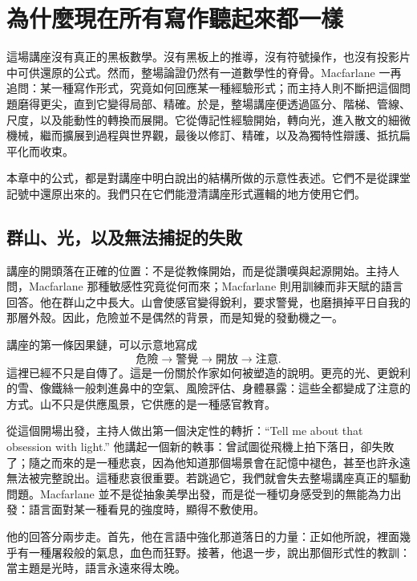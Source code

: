 \chapter{為什麼現在所有寫作聽起來都一樣}

這場講座沒有真正的黑板數學。沒有黑板上的推導，沒有符號操作，也沒有投影片中可供還原的公式。然而，整場論證仍然有一道數學性的脊骨。Macfarlane 一再追問：某一種寫作形式，究竟如何回應某一種經驗形式；而主持人則不斷把這個問題磨得更尖，直到它變得局部、精確。於是，整場講座便透過區分、階梯、管線、尺度，以及能動性的轉換而展開。它從傳記性經驗開始，轉向光，進入散文的細微機械，繼而擴展到過程與世界觀，最後以修訂、精確，以及為獨特性辯護、抵抗扁平化而收束。

\begin{remark}
本章中的公式，都是對講座中明白說出的結構所做的示意性表述。它們不是從課堂記號中還原出來的。我們只在它們能澄清講座形式邏輯的地方使用它們。
\end{remark}

\section{群山、光，以及無法捕捉的失敗}

講座的開頭落在正確的位置：不是從教條開始，而是從讚嘆與起源開始。主持人問，Macfarlane 那種敏感性究竟從何而來；Macfarlane 則用訓練而非天賦的語言回答。他在群山之中長大。山會使感官變得銳利，要求警覺，也磨損掉平日自我的那層外殼。因此，危險並不是偶然的背景，而是知覺的發動機之一。

講座的第一條因果鏈，可以示意地寫成
\begin{equation}
\text{危險} \longrightarrow \text{警覺} \longrightarrow \text{開放} \longrightarrow \text{注意}.
\end{equation}
這裡已經不只是自傳了。這是一份關於作家如何被塑造的說明。更亮的光、更銳利的雪、像鐵絲一般刺進鼻中的空氣、風險評估、身體暴露：這些全都變成了注意的方式。山不只是供應風景，它供應的是一種感官教育。

從這個開場出發，主持人做出第一個決定性的轉折：``Tell me about that obsession with light.'' 他講起一個新的軼事：曾試圖從飛機上拍下落日，卻失敗了；隨之而來的是一種悲哀，因為他知道那個場景會在記憶中褪色，甚至也許永遠無法被完整說出。這種悲哀很重要。若跳過它，我們就會失去整場講座真正的驅動問題。Macfarlane 並不是從抽象美學出發，而是從一種切身感受到的無能為力出發：語言面對某一種看見的強度時，顯得不敷使用。

他的回答分兩步走。首先，他在言語中強化那道落日的力量：正如他所說，裡面幾乎有一種屠殺般的氣息，血色而狂野。接著，他退一步，說出那個形式性的教訓：當主題是光時，語言永遠來得太晚。

